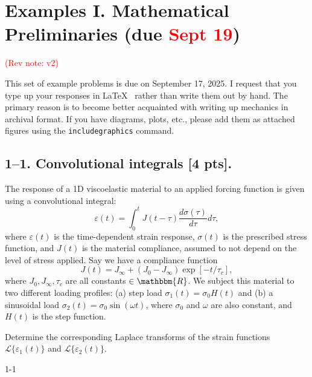 
\section*{Examples I. Mathematical Preliminaries (due \textcolor{red}{Sept 19})}
\textcolor{red}{(Rev note: v2)}
\label{PS1}

This set of example problems is due on September 17, 2025. 
I request that you type up your responses in \LaTeX~ rather than write them out by hand. 
The primary reason is to become better acquainted with writing up mechanics in archival format. 
If you have diagrams, plots, etc., please add them as attached figures using the \texttt{includegraphics} command. 

\bigskip
\subsection*{1--1. \textbf{Convolutional integrals} [4 pts].} The response of a 1D viscoelastic material to an applied forcing function is given using a convolutional integral:
\begin{equation}
    \varepsilon(t) = \int_0^t J(t-\tau) \frac{d\sigma(\tau)}{d\tau} d\tau,
\end{equation}
where $\varepsilon(t)$ is the time-dependent strain response, $\sigma(t)$ is the prescribed stress function, and $J(t)$ is the material compliance, assumed to not depend on the level of stress applied. 
Say we have a compliance function 
\begin{equation}
    J(t) = J_\infty + (J_0-J_\infty)\exp[-t/\tau_c],
\end{equation}
where $J_0, J_\infty, \tau_c$ are all constants $\in \mathbbm{R}$. 
We subject this material to two different loading profiles: (a) step load $\sigma_1(t) = \sigma_0 H(t)$ and (b) a sinusoidal load $\sigma_2(t) = \sigma_0  \sin(\omega t)$, where $\sigma_0$ and $\omega$ are also constant, and $H(t)$ is the step function. 

Determine the corresponding Laplace transforms of the strain functions $\mathcal{L}\{\varepsilon_1(t)\}$ and $\mathcal{L}\{\varepsilon_2(t)\}$. 

1-1
